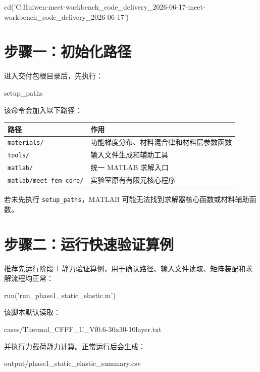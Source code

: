 \documentclass[UTF8,fontset=windows]{ctexart}
\begin{document}
\begin{code}
cd('C:\Users\You Huiwen\Desktop\fg-meet-workbench_code_delivery_2026-06-17\fg-meet-workbench_code_delivery_2026-06-17')
\end{code}

\section{步骤一：初始化路径}

进入交付包根目录后，先执行：

\begin{code}
setup_paths
\end{code}

该命令会加入以下路径：

\begin{table}[h]
\centering
\begin{tabular}{ll}
\toprule
路径 & 作用 \\
\midrule
\texttt{materials/} & 功能梯度分布、材料混合律和材料层参数函数 \\
\texttt{tools/} & 输入文件生成和辅助工具 \\
\texttt{matlab/} & 统一 MATLAB 求解入口 \\
\texttt{matlab/meet-fem-core/} & 实验室原有有限元核心程序 \\
\bottomrule
\end{tabular}
\end{table}

若未先执行 \texttt{setup\_paths}，MATLAB 可能无法找到求解器核心函数或材料辅助函数。

\section{步骤二：运行快速验证算例}

推荐先运行阶段 1 静力验证算例，用于确认路径、输入文件读取、矩阵装配和求解流程均正常：

\begin{code}
run('run_phase1_static_elastic.m')
\end{code}

该脚本默认读取：

\begin{code}
cases/Thermal_CFFF_U_Vf0.6-30x30-10layer.txt
\end{code}

并执行力载荷静力计算。正常运行后会生成：

\begin{code}
output/phase1_static_elastic_summary.csv
\end{code}
\end{document}
